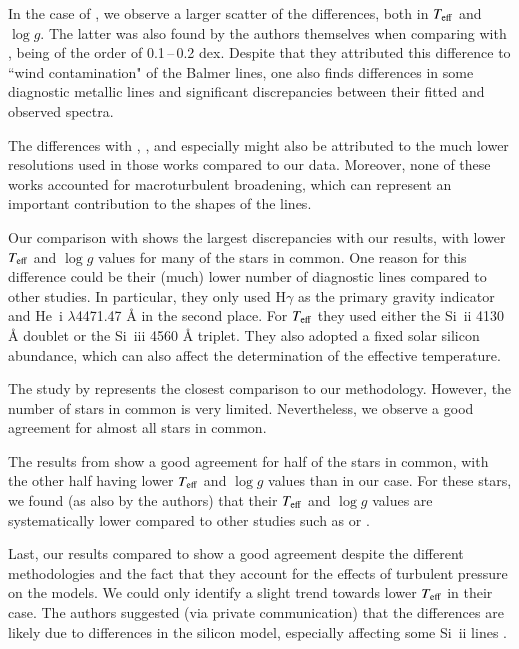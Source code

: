 \documentclass{aa}
\newcommand{\Teff}{\mbox{$T_{\rm eff}$}\xspace}
\newcommand{\logg}{\mbox{$\log g$}\xspace}
\let\oldAA\AA
\renewcommand*{\AA}{\,\oldAA\xspace}
\begin{document}
In the case of \citet{searle08}, we observe a larger scatter of the differences, both in \Teff and \logg. The latter was also found by the authors themselves when comparing with \citet{crowther06}, being of the order of 0.1\,--\,0.2 dex. Despite that they attributed this difference to ``wind contamination" of the Balmer lines, one also finds differences in some diagnostic metallic lines and significant discrepancies between their fitted and observed spectra.

The differences with \citet{mcerlean99}, \citet{crowther06}, and especially \citet{searle08} might also be attributed to the much lower resolutions used in those works compared to our data. Moreover, none of these works accounted for macroturbulent broadening, which can represent an important contribution to the shapes of the lines.

Our comparison with \citet{lefever07} shows the largest discrepancies with our results, with lower \Teff and \logg values for many of the stars in common. One reason for this difference could be their (much) lower number of diagnostic lines compared to other studies. In particular, they only used H$\gamma$ as the primary gravity indicator and He~{\sc i} $\lambda$4471.47\,{\AA} in the second place. For \Teff they used either the Si~{\sc ii} 4130\,{\AA} doublet or the Si~{\sc iii} 4560\,{\AA} triplet. They also adopted a fixed solar silicon abundance, which can also affect the determination of the effective temperature.

The study by \citet{markova08} represents the closest comparison to our methodology. However, the number of stars in common is very limited. Nevertheless, we observe a good agreement for almost all stars in common.

The results from \citet{haucke18} show a good agreement for half of the stars in common, with the other half having lower \Teff and \logg values than in our case. For these stars, we found (as also by the authors) that their \Teff and \logg values are systematically lower compared to other studies such as \citet{crowther06} or \citet{searle08}. 

Last, our results compared to \citet{webmayer22} show a good agreement despite the different methodologies and the fact that they account for the effects of turbulent pressure on the models. We could only identify a slight trend towards lower \Teff in their case. The authors suggested (via private communication) that the differences are likely due to differences in the silicon model, especially affecting some Si~{\sc ii} lines \citep[see][for more details]{webmayer22}.
\end{document}

